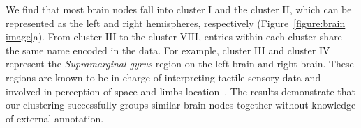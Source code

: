 \documentclass[11pt]{article}
\theoremstyle{plain}
\theoremstyle{definition}
\begin{document}
We find that most brain nodes fall into cluster I and the cluster II, which can be represented as the left and right hemispheres, respectively (Figure~\ref{figure:brain image}a). From cluster III to the cluster VIII, entries within each cluster share the same name encoded in the data. For example, cluster III and cluster IV represent the {\it Supramarginal gyrus} region on the left brain and right brain. These regions are known to be in charge of interpreting tactile sensory data and involved in perception of space and limbs location~\cite{carlson2012physiology,reed1994nature}.  
The results demonstrate that our clustering successfully groups similar brain nodes together without knowledge of external annotation.
\end{document}
